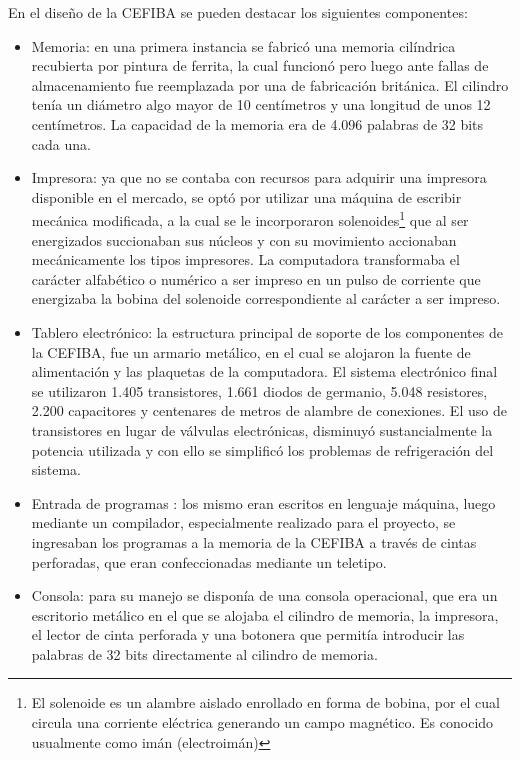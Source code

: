 \documentclass[%
 	final,
%
	notitlepage,
	narroweqnarray,
	inline,
 	twoside,
	]{ieee}
\begin{document}
En el dise\~no de la CEFIBA se pueden destacar los siguientes componentes:\\

\begin{itemize}
\item Memoria: en una primera instancia se fabric\'o una memoria cil\'indrica recubierta por pintura de ferrita, la cual funcion\'o pero luego ante fallas de almacenamiento fue reemplazada por una de fabricaci\'on brit\'anica. El cilindro ten\'ia un di\'ametro algo mayor de 10 cent\'imetros y una longitud de unos 12 cent\'imetros. La capacidad de la memoria era de 4.096 palabras de 32 bits cada una.\\

\item Impresora: ya que no se contaba con recursos para adquirir una impresora disponible en el mercado, se opt\'o por utilizar una m\'aquina de escribir mec\'anica modificada, a la cual se le incorporaron solenoides\footnote{El solenoide es un alambre aislado enrollado en forma de bobina, por el cual circula una corriente el\'ectrica generando un campo magn\'etico. Es conocido usualmente como im\'an (electroim\'an)} que al ser energizados succionaban sus n\'ucleos y con su movimiento accionaban mec\'anicamente los tipos impresores. La computadora transformaba el car\'acter alfab\'etico o num\'erico a ser impreso en un pulso de corriente que energizaba la bobina del solenoide correspondiente al car\'acter a ser impreso.\\

\item Tablero electr\'onico: la estructura principal de soporte de los componentes de la CEFIBA, fue un armario met\'alico, en el cual se alojaron la fuente de alimentaci\'on y las plaquetas de la computadora. El sistema electr\'onico final se utilizaron 1.405 transistores, 1.661 diodos de germanio, 5.048 resistores, 2.200 capacitores y centenares de metros de alambre de conexiones. El uso de transistores en lugar de v\'alvulas electr\'onicas, disminuy\'o sustancialmente la potencia utilizada y con ello se simplific\'o los problemas de refrigeraci\'on del sistema.\\

\item Entrada de programas : los mismo eran escritos en lenguaje m\'aquina, luego mediante un compilador, especialmente realizado para el proyecto, se ingresaban los programas a la memoria de la CEFIBA a trav\'es de cintas perforadas, que eran confeccionadas mediante un teletipo.\\

\item Consola: para su manejo se dispon\'ia de una consola operacional, que era un escritorio met\'alico en el que se alojaba el cilindro de memoria, la impresora, el lector de cinta perforada y una botonera que permit\'ia introducir las palabras de 32 bits directamente al cilindro de memoria.\\
\end{itemize}
\end{document}
